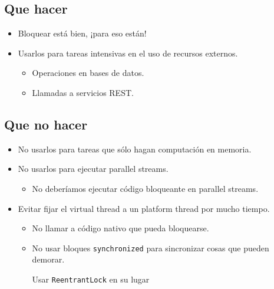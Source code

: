\documentclass{presentacion}
\begin{document}
\subsection{Que hacer}
\begin{frame}
 \begin{itemize}[<+->]
  \item Bloquear está bien, ¡para eso están!
  \item Usarlos para tareas intensivas en el uso de recursos externos.
  \begin{itemize}
   \item Operaciones en bases de datos.
   \item Llamadas a servicios REST.
   
  \end{itemize}

 \end{itemize}
\end{frame}

\subsection{Que no hacer}
\begin{frame}
 \begin{itemize}[<+->]
    \item No usarlos para tareas que sólo hagan computación en memoria.
    \item No usarlos para ejecutar parallel streams.
    \begin{itemize}
        \item No deberíamos ejecutar código bloqueante en parallel streams.
    \end{itemize}
    \item Evitar fijar el virtual thread a un platform thread por mucho tiempo.
    \begin{itemize}
        \item No llamar a código nativo que pueda bloquearse.
        \item No usar bloques \texttt{synchronized} para sincronizar cosas que pueden demorar.
       
             Usar \texttt{ReentrantLock} en su lugar
    \end{itemize}

 \end{itemize}
\end{frame}
\end{document}
